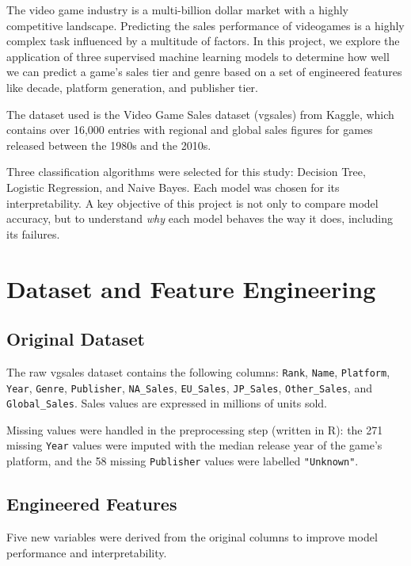 \documentclass[sigconf]{acmart}
\begin{document}
The video game industry is a multi-billion dollar market with a highly competitive landscape. Predicting the sales performance of videogames is a
highly complex task influenced by a multitude of factors. In this project, we explore the application of three supervised machine learning models
to determine how well we can predict a game's sales tier and genre based on a set of engineered features like decade, platform generation, and publisher tier.

The dataset used is the Video Game Sales dataset (vgsales) from Kaggle, which contains over 16,000 entries with regional and global sales figures
for games released between the 1980s and the 2010s.

Three classification algorithms were selected for this study: Decision Tree, Logistic Regression, and Naive Bayes. Each model was chosen for
its interpretability. A key objective of this project is not only to compare model accuracy, but to understand \textit{why} each model behaves the way it does, including its failures.

\section{Dataset and Feature Engineering}

\subsection{Original Dataset}

The raw vgsales dataset contains the following columns: \texttt{Rank}, \texttt{Name}, \texttt{Platform}, \texttt{Year}, \texttt{Genre},
\texttt{Publisher}, \texttt{NA\_Sales}, \texttt{EU\_Sales}, \texttt{JP\_Sales}, \texttt{Other\_Sales}, and \texttt{Global\_Sales}.
Sales values are expressed in millions of units sold.

Missing values were handled in the preprocessing step (written in R): the 271 missing \texttt{Year} values were imputed with the median
release year of the game's platform, and the 58 missing \texttt{Publisher} values were labelled \texttt{"Unknown"}.

\subsection{Engineered Features}

Five new variables were derived from the original columns to improve model performance and interpretability.
\end{document}
